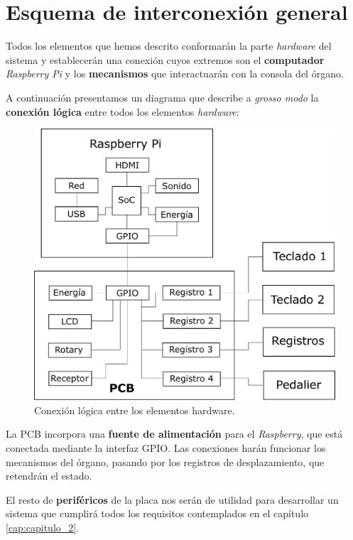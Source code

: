\section{Esquema de interconexión general}

Todos los elementos que hemos descrito conformarán la parte \textit{hardware} del sistema y establecerán una conexión cuyos extremos son el \textbf{computador} \textit{Raspberry Pi} y los \textbf{mecanismos} que interactuarán con la consola del órgano.

A continuación presentamos un diagrama que describe a \textit{grosso modo} la \textbf{conexión lógica} entre todos los elementos \textit{hardware}:

\smallskip

\begin{figure}[H]
	\noindent \begin{centering}
		\includegraphics[width=\linewidth*2/3]{capitulo3/hardware}
		\par\end{centering}
	\smallskip
	\caption{\label{fig:hardware} Conexión lógica entre los elementos hardware.}
\end{figure} 

\smallskip

La \acrshort{PCB} incorpora una \textbf{fuente de alimentación} para el \textit{Raspberry}, que está conectada mediante la interfaz \acrshort{GPIO}. Las conexiones harán funcionar los mecanismos del órgano, pasando por los registros de desplazamiento, que retendrán el estado.

El resto de \textbf{periféricos} de la placa nos serán de utilidad para desarrollar un sistema que cumplirá todos los requisitos contemplados en el capítulo \ref{cap:capitulo_2}.

\newpage
\clearpage{\pagestyle{empty}\cleardoublepage}